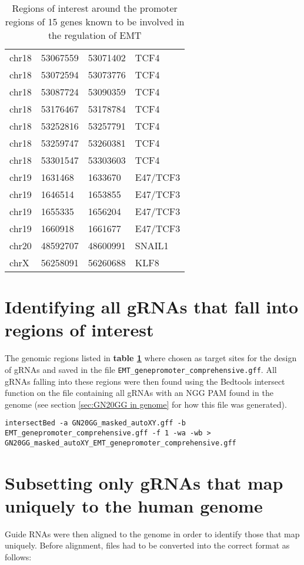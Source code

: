 \begin{table}[H]
\begin{center}
\begin{footnotesize}
\begin{tabular}{llll}
chr18 & 53067559 & 53071402	& TCF4 \\
chr18 & 53072594 & 53073776	& TCF4 \\
chr18 & 53087724 & 53090359	& TCF4 \\
chr18 & 53176467 & 53178784	& TCF4 \\
chr18 & 53252816 & 53257791	& TCF4 \\
chr18 & 53259747 & 53260381	& TCF4 \\
chr18 & 53301547 & 53303603	& TCF4 \\
chr19 & 1631468	 & 1633670	& E47/TCF3 \\
chr19 & 1646514	 & 1653855	& E47/TCF3 \\
chr19 & 1655335	 & 1656204	& E47/TCF3 \\
chr19 & 1660918	 & 1661677	& E47/TCF3  \\
chr20 & 48592707 & 48600991 & SNAIL1  \\
chrX & 56258091 & 56260688 &KLF8 \\
\hline
\end{tabular}
\caption{Regions of interest around the promoter regions of 15 genes known to be involved in the regulation of EMT \cite{DeCraene:2013kb}}
\label{tab:EMT5000-targets}
\end{footnotesize}
\end{center}
\end{table}

\section{Identifying all gRNAs that fall into regions of interest}
The genomic regions listed in \textbf{table \ref{tab:EMT5000-targets}} where chosen as target sites for the design of gRNAs  and saved in the file \verb|EMT_genepromoter_comprehensive.gff|. All gRNAs falling into these regions were then found using the Bedtools \cite{Quinlan:2010km} intersect function on the file containing all gRNAs with an NGG PAM found in the genome (see section \ref{sec:GN20GG in genome} for how this file was generated).

\begin{small}
\begin{lstlisting}
intersectBed -a GN20GG_masked_autoXY.gff -b EMT_genepromoter_comprehensive.gff -f 1 -wa -wb > GN20GG_masked_autoXY_EMT_genepromoter_comprehensive.gff
\end{lstlisting}\end{small}

\section{Subsetting only gRNAs that map uniquely to the human genome}
\label{sec:EMTguides-bedfile}
Guide RNAs were then aligned to the genome in order to identify those that map uniquely. Before alignment, files had to be converted into the correct format as follows:

